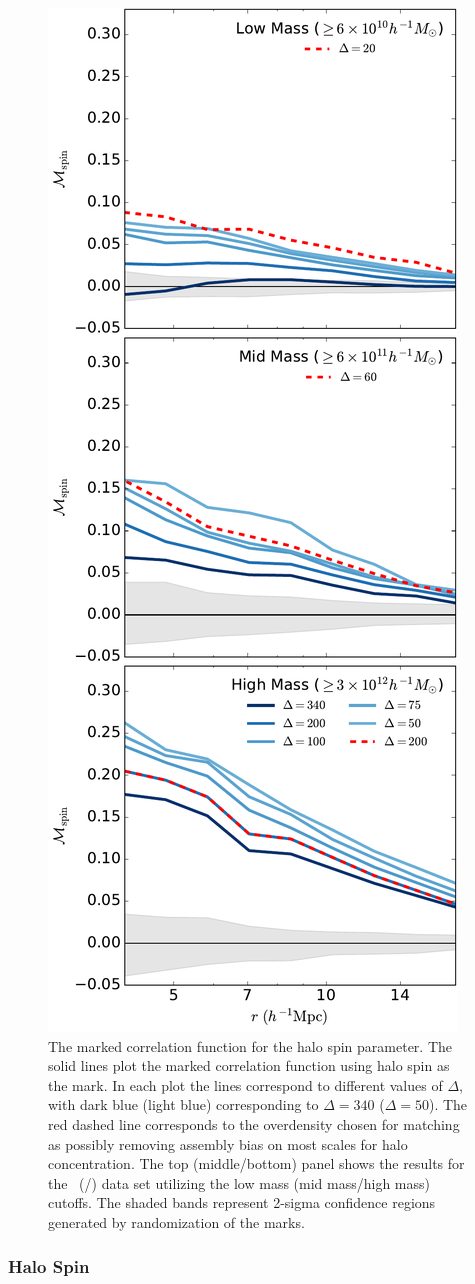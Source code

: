\documentclass[usenatbib,fleqn]{mnras}
\begin{document}
\begin{figure}
	\centering
	\includegraphics[width=.4\textwidth]{all_mcf_spin.pdf}
	\caption{
The marked correlation function for the halo spin parameter. 
The solid lines plot the marked correlation function using halo spin as the mark. In each plot the lines correspond to different values of $\Delta$, with dark blue (light blue) corresponding to $\Delta = 340$ ($\Delta = 50$). The red dashed line corresponds to the overdensity chosen for matching as possibly removing assembly bias on most scales for halo concentration. The top (middle/bottom) panel shows the results for the
\simA \ (\simB /\simC) data set utilizing the low mass (mid mass/high mass) cutoffs. The shaded bands represent 2-sigma confidence regions generated by randomization of the marks.
}
	\label{fig:cc_mcf_spin}
\end{figure}

\subsubsection{Halo Spin}
\end{document}
